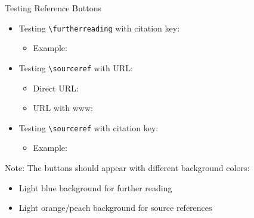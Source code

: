 \documentclass[11pt,compress,t,notes=noshow, xcolor=table]{beamer}
\begin{document}

\begin{frame}{Testing Reference Buttons}

\begin{itemize}
\item Testing \texttt{\textbackslash furtherreading} with citation key:
  \begin{itemize}
  \item Example: 
  \end{itemize}

\item Testing \texttt{\textbackslash sourceref} with URL:
  \begin{itemize}
  \item Direct URL: 
  \item URL with www: 
  \end{itemize}

\item Testing \texttt{\textbackslash sourceref} with citation key:
  \begin{itemize}
  \item Example: 
  \end{itemize}

\end{itemize}

\vspace{1em}
Note: The buttons should appear with different background colors:
\begin{itemize}
\item Light blue background for further reading
\item Light orange/peach background for source references
\end{itemize}

\end{frame}
\end{document}
